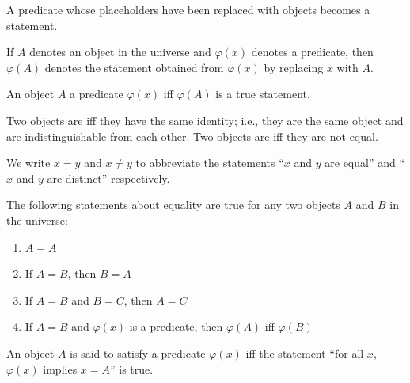 \begin{rem}
    A predicate whose placeholders have been replaced with objects becomes a statement.
\end{rem}

\begin{notation}
    If \( A \) denotes an object in the universe and \( \varphi(x) \) denotes a predicate, then
    \( \varphi(A) \) denotes the statement obtained from \( \varphi(x) \) by replacing \( x \) with \( A \).
\end{notation}

\begin{dfn}[Satisfaction]
     \label{dfn:metatheory-satisfaction}
    An object \( A \)  a predicate \( \varphi(x) \) iff \( \varphi(A) \) is a true statement.
\end{dfn}

\begin{dfn}[Equality]
     \label{dfn:metatheory-equality}
    Two objects are  iff they have the same identity; i.e., they are the same object and are indistinguishable from each other.
    Two objects are  iff they are not equal.
\end{dfn}

\begin{notation}
    We write \( x = y \) and \( x \neq y \) to abbreviate the statements ``\( x \) and \( y \) are equal'' and
    ``\( x \) and \( y \) are distinct'' respectively.
\end{notation}

\begin{meta-axiom}
     \label{meta-axiom:equality-axioms}
    The following statements about equality are true for any two objects \( A \) and \( B \) in the universe:
    \begin{enumerate}[topsep=2pt,label=\textup{\texttt{(\alph*)}}]
        \item \( A = A \)
        \item If \( A = B \), then \( B = A \)
        \item If \( A = B \) and \( B = C \), then \( A = C \)
        \item If \( A = B \) and \( \varphi(x) \) is a predicate, then \( \varphi(A) \) iff \( \varphi(B) \)
    \end{enumerate}
\end{meta-axiom}

\begin{dfn}[Uniqueness]
     \label{dfn:metatheory-unique-satisfaction}
    An object \( A \) is said to  satisfy a predicate \( \varphi(x) \) iff the statement
    ``for all \( x \),  \( \varphi(x) \) implies \( x = A \)'' is true.
\end{dfn}

